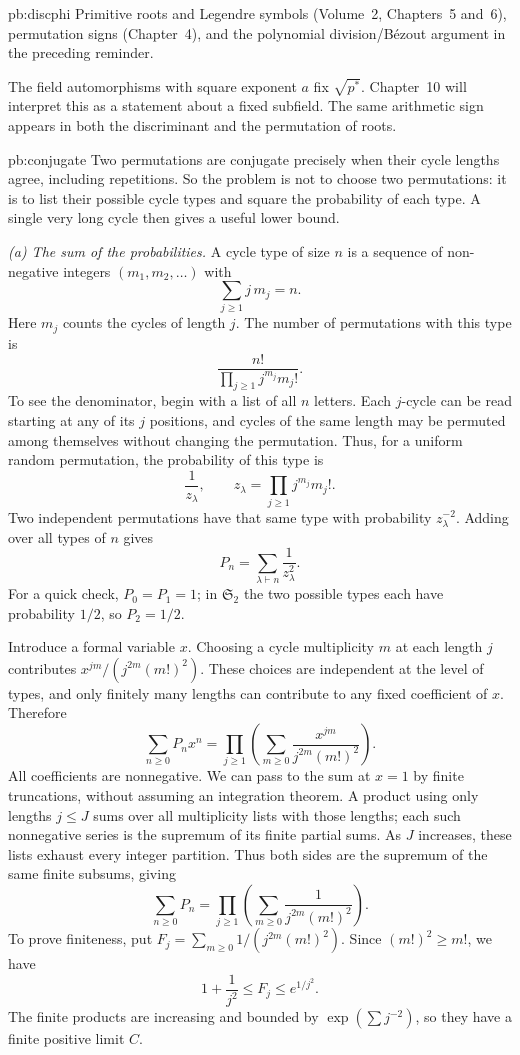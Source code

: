 \begin{solution}{pb:discphi}
\tools Primitive roots and Legendre symbols (Volume~2, Chapters~5 and~6), permutation signs (Chapter~4), and the polynomial division/B\'ezout argument in the preceding reminder.

\leads The field automorphisms with square exponent $a$ fix $\sqrt{p^*}$. Chapter~10 will interpret this as a statement about a fixed subfield. The same arithmetic sign appears in both the discriminant and the permutation of roots.
\end{solution}

\begin{solution}{pb:conjugate}
\idea Two permutations are conjugate precisely when their cycle lengths agree, including repetitions. So the problem is not to choose two permutations: it is to list their possible cycle types and square the probability of each type. A single very long cycle then gives a useful lower bound.

\writeup \emph{(a) The sum of the probabilities.}
A cycle type of size $n$ is a sequence of non-negative integers $(m_1,m_2,\ldots)$ with
\[
\sum_{j\ge1}j\,m_j=n.
\]
Here $m_j$ counts the cycles of length $j$. The number of permutations with this type is
\[
\frac{n!}{\prod_{j\ge1}j^{m_j}m_j!}.
\]
To see the denominator, begin with a list of all $n$ letters. Each $j$-cycle can be read starting at any of its $j$ positions, and cycles of the same length may be permuted among themselves without changing the permutation. Thus, for a uniform random permutation, the probability of this type is
\[
\frac1{z_\lambda},\qquad
z_\lambda=\prod_{j\ge1}j^{m_j}m_j!.
\]
Two independent permutations have that same type with probability $z_\lambda^{-2}$. Adding over all types of $n$ gives
\[
P_n=\sum_{\lambda\vdash n}\frac1{z_\lambda^2}.
\]
For a quick check, $P_0=P_1=1$; in $\mathfrak S_2$ the two possible types each have probability $1/2$, so $P_2=1/2$.

Introduce a formal variable $x$. Choosing a cycle multiplicity $m$ at each length $j$ contributes $x^{jm}/(j^{2m}(m!)^2)$. These choices are independent at the level of types, and only finitely many lengths can contribute to any fixed coefficient of $x$. Therefore
\[
\sum_{n\ge0}P_nx^n
=\prod_{j\ge1}\left(\sum_{m\ge0}
                  \frac{x^{jm}}{j^{2m}(m!)^2}\right).
\]
All coefficients are nonnegative. We can pass to the sum at $x=1$ by finite truncations, without assuming an integration theorem. A product using only lengths $j\le J$ sums over all multiplicity lists with those lengths; each such nonnegative series is the supremum of its finite partial sums. As $J$ increases, these lists exhaust every integer partition. Thus both sides are the supremum of the same finite subsums, giving
\[
\boxed{\sum_{n\ge0}P_n=
\prod_{j\ge1}\left(\sum_{m\ge0}\frac1{j^{2m}(m!)^2}\right).}
\]
To prove finiteness, put $F_j=\sum_{m\ge0}1/(j^{2m}(m!)^2)$. Since $(m!)^2\ge m!$, we have
\[
1+\frac1{j^2}\le F_j\le e^{1/j^2}.
\]
The finite products are increasing and bounded by $\exp(\sum j^{-2})$, so they have a finite positive limit $C$.


\end{solution}
